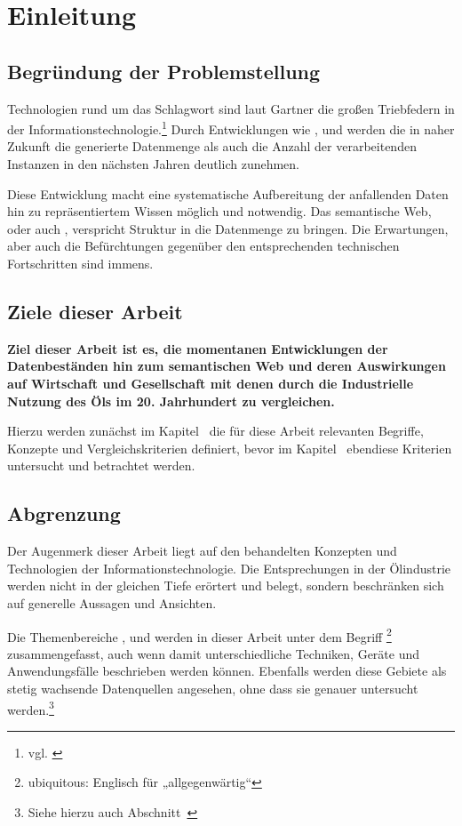 \section{Einleitung}
\label{sec:einleitung}

\subsection{Begründung der Problemstellung}

Technologien rund um das Schlagwort  sind laut Gartner die großen Triebfedern in der Informationstechnologie.\footnote{vgl. \cite{gartner2014}} Durch Entwicklungen wie ,  und  werden die in naher Zukunft die generierte Datenmenge als auch die Anzahl der verarbeitenden Instanzen in den nächsten Jahren deutlich zunehmen.

Diese Entwicklung macht eine systematische Aufbereitung der anfallenden Daten hin zu repräsentiertem Wissen möglich und notwendig. Das semantische Web, oder auch , verspricht Struktur in die Datenmenge zu bringen. Die Erwartungen, aber auch die Befürchtungen gegenüber den entsprechenden technischen Fortschritten sind immens.

\subsection{Ziele dieser Arbeit}

\textbf{Ziel dieser Arbeit ist es, die momentanen Entwicklungen der Datenbeständen hin zum semantischen Web und deren Auswirkungen auf Wirtschaft und Gesellschaft mit denen durch die Industrielle Nutzung des Öls im 20. Jahrhundert zu vergleichen.}

Hierzu werden zunächst im Kapitel~ die für diese Arbeit relevanten Begriffe, Konzepte und Vergleichskriterien definiert, bevor im Kapitel~ ebendiese Kriterien untersucht und betrachtet werden.

\subsection{Abgrenzung}

Der Augenmerk dieser Arbeit liegt auf den behandelten Konzepten und Technologien der Informationstechnologie. Die Entsprechungen in der Ölindustrie werden nicht in der gleichen Tiefe erörtert und belegt, sondern beschränken sich auf generelle Aussagen und Ansichten.

Die Themenbereiche ,  und  werden in dieser Arbeit unter dem Begriff \footnote{ubiquitous: Englisch für „allgegenwärtig“} zusammengefasst, auch wenn damit unterschiedliche Techniken, Geräte und Anwendungsfälle beschrieben werden können. Ebenfalls werden diese Gebiete als stetig wachsende Datenquellen angesehen, ohne dass sie genauer untersucht werden.\footnote{Siehe hierzu auch Abschnitt~}